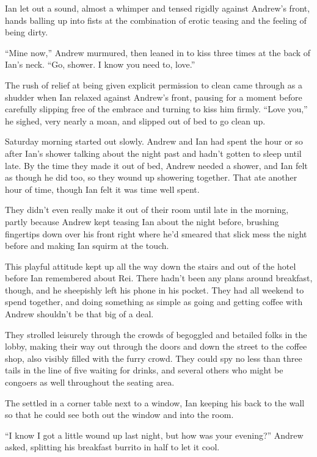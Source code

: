 Ian let out a sound, almost a whimper and tensed rigidly against Andrew's front, hands balling up into fists at the combination of erotic teasing and the feeling of being dirty.

``Mine now,'' Andrew murmured, then leaned in to kiss three times at the back of Ian's neck. ``Go, shower. I know you need to, love.''

The rush of relief at being given explicit permission to clean came through as a shudder when Ian relaxed against Andrew's front, pausing for a moment before carefully slipping free of the embrace and turning to kiss him firmly. ``Love you,'' he sighed, very nearly a moan, and slipped out of bed to go clean up.

\secdiv

Saturday morning started out slowly. Andrew and Ian had spent the hour or so after Ian's shower talking about the night past and hadn't gotten to sleep until late. By the time they made it out of bed, Andrew needed a shower, and Ian felt as though he did too, so they wound up showering together. That ate another hour of time, though Ian felt it was time well spent.

They didn't even really make it out of their room until late in the morning, partly because Andrew kept teasing Ian about the night before, brushing fingertips down over his front right where he'd smeared that slick mess the night before and making Ian squirm at the touch.

This playful attitude kept up all the way down the stairs and out of the hotel before Ian remembered about Rei. There hadn't been any plans around breakfast, though, and he sheepishly left his phone in his pocket. They had all weekend to spend together, and doing something as simple as going and getting coffee with Andrew shouldn't be that big of a deal.

They strolled leisurely through the crowds of begoggled and betailed folks in the lobby, making their way out through the doors and down the street to the coffee shop, also visibly filled with the furry crowd. They could spy no less than three tails in the line of five waiting for drinks, and several others who might be congoers as well throughout the seating area.

The settled in a corner table next to a window, Ian keeping his back to the wall so that he could see both out the window and into the room.

``I know I got a little wound up last night, but how was your evening?'' Andrew asked, splitting his breakfast burrito in half to let it cool.

